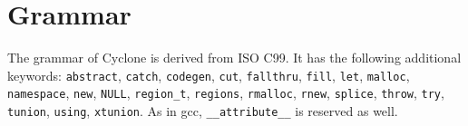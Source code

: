 \section{Grammar}


\newcommand{\rulelabel}[1]{%
  \parbox[b]{\labelwidth}{\makebox[0pt][l]{\hypertarget{#1}{\textit{#1}}:}}}
\newcommand{\ruleoneoflabel}[1]{%
  \parbox[b]{\labelwidth}%
  {\makebox[0pt][l]{\hypertarget{#1}{\textit{#1}}: one of}}}
\newenvironment{rules}[1]{%
  \begin{list}{}{}%
    \renewcommand{\makelabel}{\rulelabel}%
  \item[#1]\mbox{}\\}{\end{list}}
\newenvironment{rulesoneof}[1]{%
  \begin{list}{}{}%
    \renewcommand{\makelabel}{\ruleoneoflabel}%
  \item[#1]\mbox{}\\}{\end{list}}

\newcommand{\nt}[1]{\hyperlink{#1}{\textit{#1}}} %
\newcommand{\tk}[1]{\texttt{#1}}                 %
\newcommand{\opt}{\ensuremath{_{\it\textcolor{bluegray}{opt}}}}

The grammar of Cyclone is derived from ISO C99.
It has the following additional keywords:
\texttt{abstract}, \texttt{catch},
\texttt{codegen}, \texttt{cut}, \texttt{fallthru}, \texttt{fill},
\texttt{let}, \texttt{malloc},
\texttt{namespace}, \texttt{new}, \texttt{NULL},
\texttt{region_t}, \texttt{regions},
\texttt{rmalloc}, \texttt{rnew}, \texttt{splice},
\texttt{throw}, \texttt{try}, \texttt{tunion}, \texttt{using},
\texttt{xtunion}.  As in gcc,
\texttt{__attribute__} is reserved as well.

